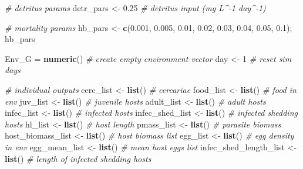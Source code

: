 \documentclass[10,portrait]{article}
\newenvironment{Shaded}{\begin{snugshade}}{\end{snugshade}}
\newcommand{\KeywordTok}[1]{\textcolor[rgb]{0.13,0.29,0.53}{\textbf{#1}}}
\newcommand{\DecValTok}[1]{\textcolor[rgb]{0.00,0.00,0.81}{#1}}
\newcommand{\FloatTok}[1]{\textcolor[rgb]{0.00,0.00,0.81}{#1}}
\newcommand{\StringTok}[1]{\textcolor[rgb]{0.31,0.60,0.02}{#1}}
\newcommand{\CommentTok}[1]{\textcolor[rgb]{0.56,0.35,0.01}{\textit{#1}}}
\newcommand{\NormalTok}[1]{#1}
\begin{document}
\begin{Shaded}
\begin{Highlighting}[]
{{          \CommentTok{# detritus params}
\NormalTok{          detr_pars <-}\StringTok{ }\FloatTok{0.25} \CommentTok{# detritus input (mg L^-1 day^-1)}
          
          \CommentTok{# mortality params }
\NormalTok{          hb_pars <-}\StringTok{ }\KeywordTok{c}\NormalTok{(}\FloatTok{0.001}\NormalTok{, }\FloatTok{0.005}\NormalTok{, }\FloatTok{0.01}\NormalTok{, }\FloatTok{0.02}\NormalTok{, }\FloatTok{0.03}\NormalTok{, }\FloatTok{0.04}\NormalTok{, }\FloatTok{0.05}\NormalTok{, }\FloatTok{0.1}\NormalTok{); hb_pars}
        
\NormalTok{        Env_G =}\StringTok{ }\KeywordTok{numeric}\NormalTok{() }\CommentTok{# create empty environment vector }
\NormalTok{        day <-}\StringTok{ }\DecValTok{1} \CommentTok{# reset sim days }
        
        \CommentTok{# individual outputs}
\NormalTok{        cerc_list <-}\StringTok{ }\KeywordTok{list}\NormalTok{() }\CommentTok{# cercariae   }
\NormalTok{        food_list <-}\StringTok{ }\KeywordTok{list}\NormalTok{() }\CommentTok{# food in env }
\NormalTok{        juv_list <-}\StringTok{ }\KeywordTok{list}\NormalTok{() }\CommentTok{# juvenile hosts}
\NormalTok{        adult_list <-}\StringTok{ }\KeywordTok{list}\NormalTok{() }\CommentTok{# adult hosts }
\NormalTok{        infec_list <-}\StringTok{ }\KeywordTok{list}\NormalTok{() }\CommentTok{# infected hosts}
\NormalTok{        infec_shed_list <-}\StringTok{ }\KeywordTok{list}\NormalTok{() }\CommentTok{# infected shedding hosts}
\NormalTok{        hl_list <-}\StringTok{ }\KeywordTok{list}\NormalTok{() }\CommentTok{# host length}
\NormalTok{        pmass_list <-}\StringTok{ }\KeywordTok{list}\NormalTok{() }\CommentTok{# parasite biomass }
\NormalTok{        host_biomass_list <-}\StringTok{ }\KeywordTok{list}\NormalTok{() }\CommentTok{# host biomass list }
\NormalTok{        egg_list <-}\StringTok{ }\KeywordTok{list}\NormalTok{() }\CommentTok{# egg density in env}
\NormalTok{        egg_mean_list <-}\StringTok{ }\KeywordTok{list}\NormalTok{() }\CommentTok{# mean host eggs list}
\NormalTok{        infec_shed_length_list <-}\StringTok{ }\KeywordTok{list}\NormalTok{() }\CommentTok{# length of infected shedding hosts}
        
}}
\end{Highlighting}
\end{Shaded}
\end{document}
